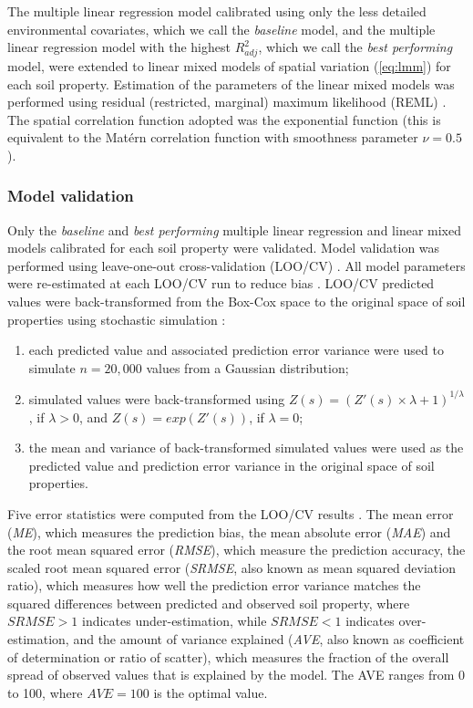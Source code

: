 The multiple linear regression model calibrated using only the less detailed 
environmental covariates, which we call the \textit{baseline} model, and the 
multiple linear regression model with the highest ${R}^{2}_{adj}$, which we call
the \textit{best performing} model, were extended to linear mixed models of 
spatial variation (\autoref{eq:lmm}) for each soil property. Estimation of the 
parameters of the linear mixed models was performed using residual (restricted,
marginal) maximum likelihood (REML) \citep{RibeiroEtAl2001, LarkEtAl2004}. The 
spatial correlation function adopted was the exponential function (this is 
equivalent to the Matérn correlation function with smoothness parameter 
$\nu=0.5$ \citep{Stein1999}).

\subsubsection*{Model validation}
\label{subsec:validation}

Only the \textit{baseline} and \textit{best performing} multiple linear 
regression and linear mixed models calibrated for each soil property were 
validated. Model validation was performed using leave-one-out cross-validation 
(LOO\-/CV) \citep{BrusEtAl2011}. All model parameters were re-estimated at each
LOO\-/CV run to reduce bias \citep{LaslettEtAl1987}. LOO\-/CV predicted values 
were back-transformed from the Box-Cox space to the original space of soil 
properties using stochastic simulation \citep{ChristensenEtAl2001}:

\begin{enumerate}
 \item each predicted value and associated prediction error variance were used 
 to simulate $n = 20,000$ values from a Gaussian distribution;
 \item simulated values were back-transformed using 
 $Z(s) = (Z'(s) \times \lambda + 1)^{1 / \lambda}$, if $\lambda > 0$, and 
 $Z(s) = exp(Z'(s))$, if $\lambda = 0$;
 \item the mean and variance of back-transformed simulated values were used as 
 the predicted value and prediction error variance in the original space of 
 soil properties.
\end{enumerate}

Five error statistics were computed from the LOO\-/CV results 
\citep{JanssenEtAl1995, KempenEtAl2010, BrusEtAl2011}. The mean error 
(\textit{ME}), which measures the prediction bias, the mean absolute error 
(\textit{MAE}) and the root mean squared error (\textit{RMSE}), which measure 
the prediction accuracy, the scaled root mean squared error (\textit{SRMSE}, 
also known as mean squared deviation ratio), which measures how well the 
prediction error variance matches the squared differences between predicted and 
observed soil property, where $\textit{SRMSE}>1$ indicates under-estimation, 
while $\textit{SRMSE}<1$ indicates over-estimation, and the amount of variance 
explained (\textit{AVE}, also known as coefficient of determination or ratio of
scatter), which measures the fraction of the overall spread of observed values 
that is explained by the model. The AVE ranges from 0 to 100, where 
$\textit{AVE}=100$ is the optimal value.

